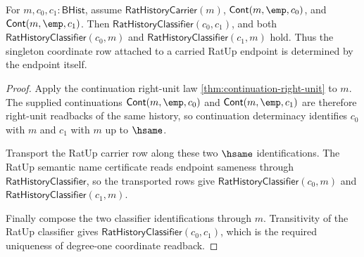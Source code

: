 \begin{theorem}
\label{thm:numfield-reflexive-rational-coordinate-readback-uniqueness}
For $m,c_0,c_1:\mathsf{BHist}$, assume
$\mathsf{RatHistoryCarrier}(m)$,
$\mathsf{Cont}(m,\emp,c_0)$, and $\mathsf{Cont}(m,\emp,c_1)$. Then
$\mathsf{RatHistoryClassifier}(c_0,c_1)$, and both
$\mathsf{RatHistoryClassifier}(c_0,m)$ and
$\mathsf{RatHistoryClassifier}(c_1,m)$ hold. Thus the singleton coordinate
row attached to a carried RatUp endpoint is determined by the endpoint itself.
\end{theorem}
\begin{proof}
Apply the continuation right-unit law
\autoref{thm:continuation-right-unit} to $m$. The supplied continuations
$\mathsf{Cont}(m,\emp,c_0)$ and $\mathsf{Cont}(m,\emp,c_1)$ are therefore
right-unit readbacks of the same history, so continuation determinacy
identifies $c_0$ with $m$ and $c_1$ with $m$ up to $\hsame$.

Transport the RatUp carrier row along these two $\hsame$ identifications. The
RatUp semantic name certificate reads endpoint sameness through
$\mathsf{RatHistoryClassifier}$, so the transported rows give
$\mathsf{RatHistoryClassifier}(c_0,m)$ and
$\mathsf{RatHistoryClassifier}(c_1,m)$.

Finally compose the two classifier identifications through $m$. Transitivity
of the RatUp classifier gives $\mathsf{RatHistoryClassifier}(c_0,c_1)$, which
is the required uniqueness of degree-one coordinate readback.
\end{proof}

